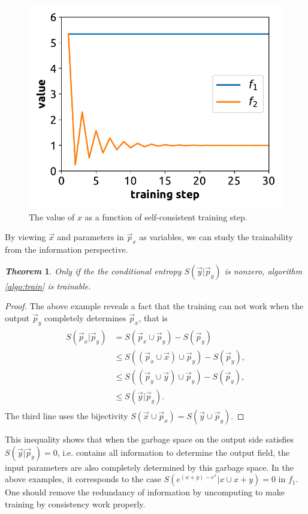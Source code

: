 \documentclass[aps,twocolumn,longbibliography,english,superscriptaddress,prr]{revtex4-1}
\newcommand{\<}{\langle}
\renewcommand{\>}{\rangle}
\newcommand{\vx}{{\vec x}}
\newcommand{\vp}{{\vec p}}
\newcommand{\vy}{{\vec y}}
\newtheorem{theorem}{\textit{Theorem}}
\theoremstyle{definition}\newtheorem{definition}{\textit{Definition}}
\begin{document}
\begin{figure}
    \centerline{\includegraphics[width=0.9\columnwidth,trim={0 0.3cm 0 0},clip]{images/fig1.pdf}}
    \caption{The value of $x$ as a function of self-consistent training step.}\label{fig:invtrain}
\end{figure}

By viewing $\vx$ and parameters in $\vp_x$ as variables, we can study the trainability from the information perspective.
\begin{theorem}
    Only if the the conditional entropy $S(\vy|\vp_y)$ is nonzero, algorithm \ref{algo:train} is trainable.
\end{theorem}
\begin{proof}
The above example reveals a fact that the training can not work when the output $\vp_y$ completely determines $\vp_x$, that is
\begin{align}
    \begin{split}
        S(\vp_x | \vp_y) &= S(\vp_x \cup \vp_y) - S(\vp_y)\\
        &\leq S\left((\vp_x \cup \vx) \cup \vp_y \right) - S(\vp_y),\\
        &\leq S\left((\vp_y \cup \vy) \cup \vp_y\right) - S(\vp_y),\\
    &\leq S(\vy|\vp_y).
    \end{split}
\end{align}
The third line uses the bijectivity $S(\vx \cup \vp_x) = S(\vy \cup \vp_y)$.
\end{proof}
This inequality shows that when the garbage space on the output side satisfies $S(\vy | \vp_y) = 0$, i.e. contains all information to determine the output field, the input parameters are also completely determined by this garbage space.
In the above examples, it corresponds to the case $S\left(e^{(x+y)-e^x} | x \cup x + y\right) = 0$ in $f_1$.
One should remove the redundancy of information by uncomputing to make training by consistency work properly.
\end{document}
